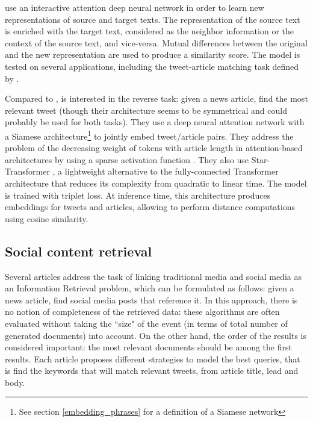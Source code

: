 \cite{zhao_interactive_2019} use an interactive attention deep neural network in order to learn new representations of source and target texts. The representation of the source text is enriched with the target text, considered as the neighbor information or the context of the source text, and vice-versa. Mutual  differences  between  the  original  and  the  new representation are used to produce a similarity score. The model is tested on several applications, including the tweet-article matching task defined by \cite{guo_linking_2013}.

Compared to \cite{guo_linking_2013}, \cite{danovitch2020linking} is interested in the reverse task: given a news article, find the most relevant tweet (though their architecture seems to be symmetrical and could probably be used for both tasks). They use a deep neural attention network with a Siamese architecture\footnote{See section \ref{embedding_phrases} for a definition of a Siamese network} to jointly embed tweet/article pairs. They address the problem of the decreasing weight of tokens with article length in attention-based architectures by using a sparse activation function \citep{peters2019sparse}. They also use Star-Transformer \citep{guo2019star}, a lightweight alternative to the fully-connected Transformer architecture \citep{vaswani2017attention} that reduces its complexity from quadratic to linear time. The model is trained with triplet loss. At inference time, this architecture produces embeddings for tweets and articles, allowing to perform distance computations using cosine similarity.

\subsection{Social content retrieval}
\label{Social content retrieval}
Several articles \citep{tsagkias_linking_2011, tanev_enhancing_2012, suarez2018data} address the task of linking traditional media and social media as an Information Retrieval problem, which can be formulated as follows: given a news article, find social media posts that reference it. In this approach, there is no notion of completeness of the retrieved data: these algorithms are often evaluated without taking the ``size" of the event (in terms of total number of generated documents) into account. On the other hand, the order of the results is considered important: the most relevant documents should be among the first results. Each article proposes different strategies to model the best queries, that is find the keywords that will match relevant tweets, from article title, lead and body.

